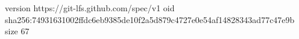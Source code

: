 version https://git-lfs.github.com/spec/v1
oid sha256:74931631002ffdc6eb9385de10f2a5d879c4727e0e54af14828343ad77c47e9b
size 67
